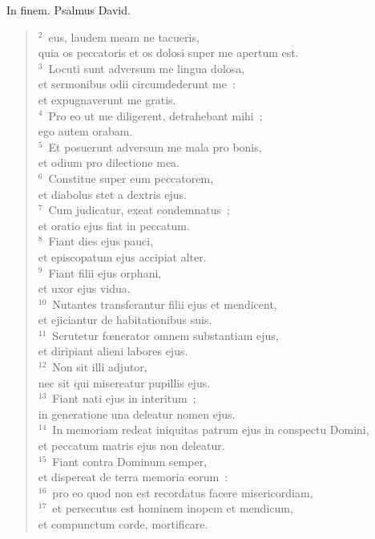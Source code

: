 \bchapter[Psalm]
In finem. Psalmus David.
\begin{verse}${}^{2}$~eus, laudem meam ne tacueris,\\ quia os peccatoris et os dolosi super me apertum est.\\
${}^{3}$~Locuti sunt adversum me lingua dolosa,\\ et sermonibus odii circumdederunt me~:\\ et expugnaverunt me gratis.\\
${}^{4}$~Pro eo ut me diligerent, detrahebant mihi~;\\ ego autem orabam.\\
${}^{5}$~Et posuerunt adversum me mala pro bonis,\\ et odium pro dilectione mea.\\
${}^{6}$~Constitue super eum peccatorem,\\ et diabolus stet a dextris ejus.\\
${}^{7}$~Cum judicatur, exeat condemnatus~;\\ et oratio ejus fiat in peccatum.\\
${}^{8}$~Fiant dies ejus pauci,\\ et episcopatum ejus accipiat alter.\\
${}^{9}$~Fiant filii ejus orphani,\\ et uxor ejus vidua.\\
${}^{10}$~Nutantes transferantur filii ejus et mendicent,\\ et ejiciantur de habitationibus suis.\\
${}^{11}$~Scrutetur fœnerator omnem substantiam ejus,\\ et diripiant alieni labores ejus.\\
${}^{12}$~Non sit illi adjutor,\\ nec sit qui misereatur pupillis ejus.\\
${}^{13}$~Fiant nati ejus in interitum~;\\ in generatione una deleatur nomen ejus.\\
${}^{14}$~In memoriam redeat iniquitas patrum ejus in conspectu Domini,\\ et peccatum matris ejus non deleatur.\\
${}^{15}$~Fiant contra Dominum semper,\\ et dispereat de terra memoria eorum~:\\
${}^{16}$~pro eo quod non est recordatus facere misericordiam,\\
${}^{17}$~et persecutus est hominem inopem et mendicum,\\ et compunctum corde, mortificare.\\

\end{verse}
